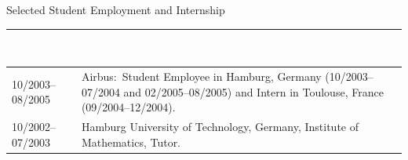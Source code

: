 \bigskip
\large Selected Student Employment and Internship\\[-8pt]
\noindent\rule{15.25cm}{0.4pt}\\[3pt]
\normalsize
\begin{tabular}{@{}p{3.2cm}p{11.3cm}@{}}

    10/2003--08/2005 & Airbus:~Student Employee in Hamburg, Germany (10/2003--07/2004 and 02/2005--08/2005) and Intern in Toulouse, France (09/2004--12/2004).\\[33pt]
    10/2002--07/2003 &  Hamburg University of Technology, Germany, Institute of Mathematics,  %
    Tutor. 
   
\end{tabular}




